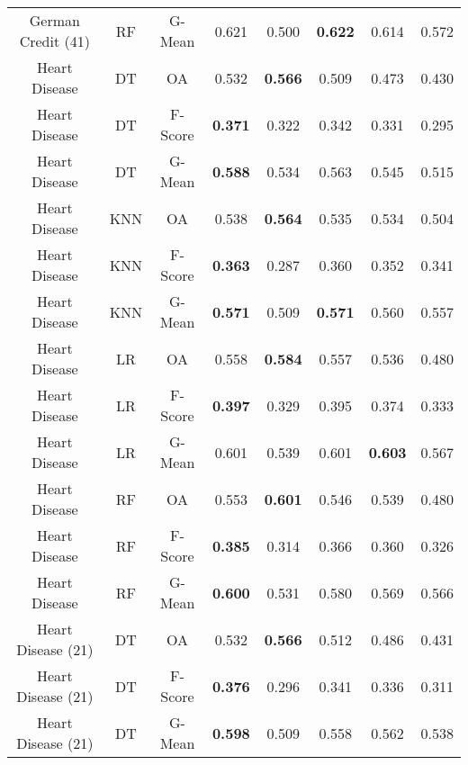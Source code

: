 \begin{longtable}{cccccccc}
German Credit (41) &         RF &  G-Mean &          0.621 &          0.500 & \textbf{0.622} &          0.614 &          0.572 \\
     Heart Disease &         DT &      OA &          0.532 & \textbf{0.566} &          0.509 &          0.473 &          0.430 \\
     Heart Disease &         DT & F-Score & \textbf{0.371} &          0.322 &          0.342 &          0.331 &          0.295 \\
     Heart Disease &         DT &  G-Mean & \textbf{0.588} &          0.534 &          0.563 &          0.545 &          0.515 \\
     Heart Disease &        KNN &      OA &          0.538 & \textbf{0.564} &          0.535 &          0.534 &          0.504 \\
     Heart Disease &        KNN & F-Score & \textbf{0.363} &          0.287 &          0.360 &          0.352 &          0.341 \\
     Heart Disease &        KNN &  G-Mean & \textbf{0.571} &          0.509 & \textbf{0.571} &          0.560 &          0.557 \\
     Heart Disease &         LR &      OA &          0.558 & \textbf{0.584} &          0.557 &          0.536 &          0.480 \\
     Heart Disease &         LR & F-Score & \textbf{0.397} &          0.329 &          0.395 &          0.374 &          0.333 \\
     Heart Disease &         LR &  G-Mean &          0.601 &          0.539 &          0.601 & \textbf{0.603} &          0.567 \\
     Heart Disease &         RF &      OA &          0.553 & \textbf{0.601} &          0.546 &          0.539 &          0.480 \\
     Heart Disease &         RF & F-Score & \textbf{0.385} &          0.314 &          0.366 &          0.360 &          0.326 \\
     Heart Disease &         RF &  G-Mean & \textbf{0.600} &          0.531 &          0.580 &          0.569 &          0.566 \\
Heart Disease (21) &         DT &      OA &          0.532 & \textbf{0.566} &          0.512 &          0.486 &          0.431 \\
Heart Disease (21) &         DT & F-Score & \textbf{0.376} &          0.296 &          0.341 &          0.336 &          0.311 \\
Heart Disease (21) &         DT &  G-Mean & \textbf{0.598} &          0.509 &          0.558 &          0.562 &          0.538 \\

\end{longtable}
